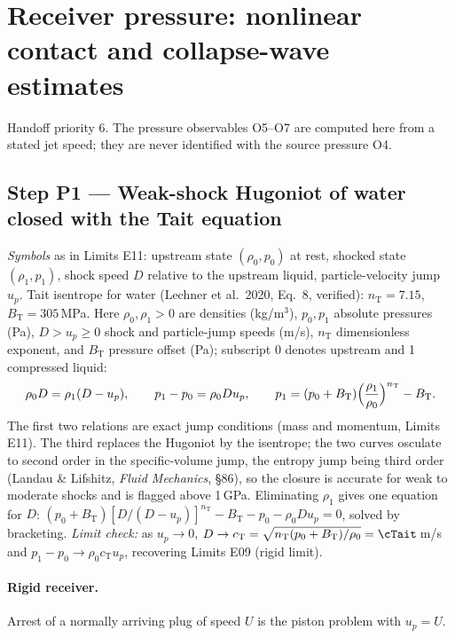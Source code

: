 \section{Receiver pressure: nonlinear contact and collapse-wave estimates}\label{sec:receiver}
Handoff priority 6. The pressure observables O5--O7 are computed here from a stated jet speed; they are
never identified with the source pressure O4.

\subsection{Step P1 --- Weak-shock Hugoniot of water closed with the Tait equation}
\emph{Symbols} as in Limits E11: upstream state $(\rho_0,p_0)$ at rest, shocked state $(\rho_1,p_1)$, shock speed
$D$ relative to the upstream liquid, particle-velocity jump $u_p$. Tait isentrope for water (Lechner et al.\ 2020,
Eq.~8, verified): $n_{\mathrm T}=7.15$, $B_{\mathrm T}=305$\,MPa.
Here $\rho_0,\rho_1>0$ are densities (kg/m$^3$), $p_0,p_1$ absolute pressures (Pa),
$D>u_p\ge0$ shock and particle-jump speeds (m/s), $n_{\mathrm T}$ dimensionless exponent,
and $B_{\mathrm T}$ pressure offset (Pa); subscript 0 denotes upstream and 1 compressed liquid:
\begin{equation}
\rho_0D=\rho_1(D-u_p),\qquad p_1-p_0=\rho_0Du_p,\qquad p_1=(p_0+B_{\mathrm T})\Bigl(\frac{\rho_1}{\rho_0}\Bigr)^{n_{\mathrm T}}-B_{\mathrm T}.\label{eq:hug}
\end{equation}
The first two relations are exact jump conditions (mass and momentum, Limits E11). The third replaces the
Hugoniot by the isentrope; the two curves osculate to second order in the specific-volume jump, the entropy
jump being third order (Landau \& Lifshitz, \emph{Fluid Mechanics}, \S86), so the closure is accurate for weak
to moderate shocks and is flagged above 1\,GPa. Eliminating $\rho_1$ gives one equation for $D$:
$(p_0+B_{\mathrm T})[D/(D-u_p)]^{n_{\mathrm T}}-B_{\mathrm T}-p_0-\rho_0Du_p=0$, solved by bracketing.
\emph{Limit check:} as $u_p\to0$, $D\to c_{\mathrm T}=\sqrt{n_{\mathrm T}(p_0+B_{\mathrm T})/\rho_0}=\cTait$\,m/s and
$p_1-p_0\to\rho_0c_{\mathrm T}u_p$, recovering Limits E09 (rigid limit).

\paragraph{Rigid receiver.} Arrest of a normally arriving plug of speed $U$ is the piston problem with $u_p=U$.
